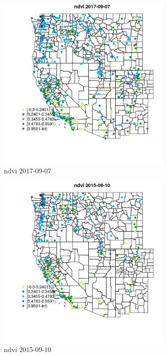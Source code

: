 \begin{figure} 
\centering  
\includegraphics[width=0.77\textwidth]{Code_Outputs/Report_ML_input_PM25_Step4_part_e_de_duplicated_aves_compiled_2019-05-20wNAs_MapObsndvi2017-09-07.jpg} 
\caption{\label{fig:Report_ML_input_PM25_Step4_part_e_de_duplicated_aves_compiled_2019-05-20wNAsMapObsndvi2017-09-07}ndvi 2017-09-07} 
\end{figure} 
 

\begin{figure} 
\centering  
\includegraphics[width=0.77\textwidth]{Code_Outputs/Report_ML_input_PM25_Step4_part_e_de_duplicated_aves_compiled_2019-05-20wNAs_MapObsndvi2015-09-10.jpg} 
\caption{\label{fig:Report_ML_input_PM25_Step4_part_e_de_duplicated_aves_compiled_2019-05-20wNAsMapObsndvi2015-09-10}ndvi 2015-09-10} 
\end{figure} 
 

